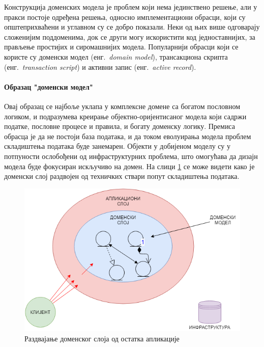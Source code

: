 \documentclass[12pt,oneside]{memoir}
\begin{document}
Конструкција доменских модела је проблем који нема јединствено решење, али у пракси постоје одређена решења, односно имплементациони обрасци, који су општеприхваћени и углавном су се добро показали. Неки од њих више одговарају сложенијим поддоменима, док се други могу искористити код једноставнијих, за прављење простијих и сиромашнијих модела. Популарнији обрасци који се користе су доменски модел (енг.~\textit{domain model}), трансакциона скрипта (енг.~\textit{transaction script}) и активни запис (енг.~\textit{active record})\cite{peaa}.

\paragraph{Образац "доменски модел"}
Овај образац се најбоље уклапа у комплексне домене са богатом пословном логиком, и подразумева креирање објектно-оријентисаног модела који садржи податке, пословне процесе и правила, и богату доменску логику. Премиса обрасца је да не постоји база података, и да током еволуирања модела проблем складиштења података буде занемарен. Објекти у добијеном моделу су у потпуности ослобођени од инфраструктурних проблема, што омогућава да дизајн модела буде фокусиран искључиво на домен. На слици \ref{fig:razdvajanjedomenskogsloja} се може видети како је доменски слој раздвојен од техничких ствари попут складиштења података.

\begin{figure}[!ht]
  \centering
  \includegraphics[scale=0.6]{slike/razdvajanje-domenskog-sloja.png}
  \caption{Раздвајање доменског слоја од остатка апликације}
  \label{fig:razdvajanjedomenskogsloja}
\end{figure}
\end{document}
